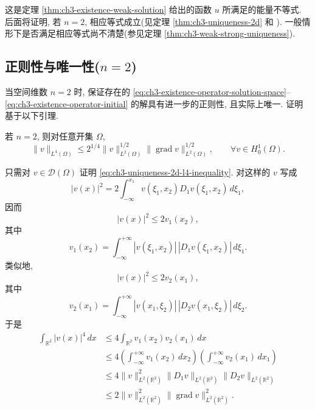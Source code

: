 \begin{Remark}
这是定理 \ref{thm:ch3-existence-weak-solution} 给出的函数 $u$ 所满足的能量不等式. 后面将证明, 若 $n=2$, 相应等式成立(见定理 \ref{thm:ch3-uniqueness-2d} 和 ). 一般情形下是否满足相应等式尚不清楚(参见定理 \ref{thm:ch3-weak-strong-uniqueness}).
\end{Remark}

\subsection{正则性与唯一性($n=2$)}
\label{subsec:ch3-regularity-uniqueness-2d}
当空间维数 $n=2$ 时,  保证存在的 \eqref{eq:ch3-existence-operator-solution-space}--\eqref{eq:ch3-existence-operator-initial} 的解具有进一步的正则性, 且实际上唯一. 证明基于以下引理.

\begin{Lemma}
\label{lem:ch3-ladyzhenskaya-2d}
若 $n=2$, 则对任意开集 $\Omega$,
\begin{equation}
\lVert v\rVert_{L^4(\Omega)}
\leq2^{1/4}\lVert v\rVert_{L^2(\Omega)}^{1/2}
\lVert\operatorname{grad}v\rVert_{L^2(\Omega)}^{1/2},
\qquad\forall v\in H_0^1(\Omega).
\label{eq:ch3-uniqueness-2d-l4-inequality}
\end{equation}
\end{Lemma}

\begin{Proof}
只需对 $v\in\mathcal D(\Omega)$ 证明 \eqref{eq:ch3-uniqueness-2d-l4-inequality}. 对这样的 $v$ 写成
\[
|v(x)|^2=2\int_{-\infty}^{x_1}v(\xi_1,x_2)D_1v(\xi_1,x_2)\,d\xi_1,
\]
因而
\begin{equation}
|v(x)|^2\leq2v_1(x_2),
\label{eq:ch3-uniqueness-2d-v1-bound}
\end{equation}
其中
\begin{equation}
v_1(x_2)=\int_{-\infty}^{+\infty}
|v(\xi_1,x_2)|\,|D_1v(\xi_1,x_2)|\,d\xi_1.
\label{eq:ch3-uniqueness-2d-v1-definition}
\end{equation}
类似地,
\begin{equation}
|v(x)|^2\leq2v_2(x_1),
\label{eq:ch3-uniqueness-2d-v2-bound}
\end{equation}
其中
\begin{equation}
v_2(x_1)=\int_{-\infty}^{+\infty}
|v(x_1,\xi_2)|\,|D_2v(x_1,\xi_2)|\,d\xi_2.
\label{eq:ch3-uniqueness-2d-v2-definition}
\end{equation}
于是
\[
\begin{aligned}
\int_{\mathbb R^2}|v(x)|^4\,dx
&\leq4\int_{\mathbb R^2}v_1(x_2)v_2(x_1)\,dx\\
&\leq4\left(\int_{-\infty}^{+\infty}v_1(x_2)\,dx_2\right)
\left(\int_{-\infty}^{+\infty}v_2(x_1)\,dx_1\right)\\
&\leq4\lVert v\rVert_{L^2(\mathbb R^2)}^2
\lVert D_1v\rVert_{L^2(\mathbb R^2)}
\lVert D_2v\rVert_{L^2(\mathbb R^2)}\\
&\leq2\lVert v\rVert_{L^2(\mathbb R^2)}^2
\lVert\operatorname{grad}v\rVert_{L^2(\mathbb R^2)}^2.
\end{aligned}
\]
\end{Proof}

